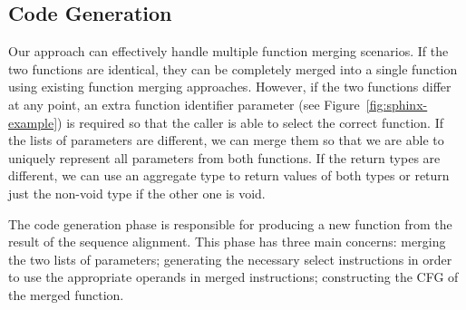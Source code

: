 

\subsection{Code Generation}
Our approach can effectively handle multiple function merging scenarios. If the two functions are identical, they can be completely merged
into a single function using existing function merging approaches. However, if the two functions differ at any point, an extra function
identifier parameter (see Figure~\ref{fig:sphinx-example}) is required so that the caller is able to select the correct function. If the
lists of parameters are different, we can merge them so that we are able to uniquely represent all parameters from both functions. If the
return types are different, we can use an aggregate type to return values of both types or return just the non-void type if the other one
is void.

 The code generation phase is responsible for producing a new function from the result of the sequence alignment. This phase has
three main concerns: merging the two lists of parameters;
generating the necessary select instructions in order to
use the appropriate operands in merged instructions;
constructing the CFG of the merged function.





